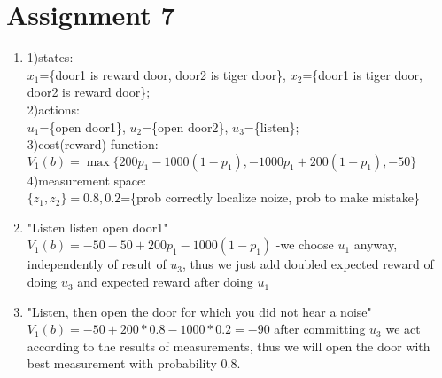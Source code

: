 \documentclass{article}
\begin{document}
\section*{Assignment 7}
\begin{enumerate}
\item 1)states:\\$x_1$=\{door1 is reward door, door2 is tiger door\}, 
$x_2$=\{door1 is tiger door, door2 is reward door\};
\\2)actions:\\
$u_1$=\{open door1\}, 
$u_2$=\{open door2\}, 
$u_3$=\{listen\};
\\3)cost(reward) function: \\
$V_{1}(b)=\max\{200p_{1}-1000(1-p_{1}), -1000p_{1}+200(1-p_{1}), -50\}$
\\4)measurement space:\\
$\{z_{1}, z_{2}\}={0.8, 0.2}$=\{prob correctly localize noize, prob to make mistake\}
\item "Listen listen open door1"\\
$V_{1}(b)=-50-50+200p_{1}-1000(1-p_{1})$ -we choose $u_{1}$ anyway, independently of result of $u_{3}$, thus we just add doubled expected reward of doing $u_{3}$ and expected reward after doing $u_{1}$
\item "Listen,
then open the door for which you did not hear a noise"
$V_{1}(b)=-50+200*0.8-1000*0.2=-90$ after committing $u_{3}$ we act according to the results of measurements, thus we will open the door with best measurement with probability 0.8.
\end{enumerate}
\end{document}
